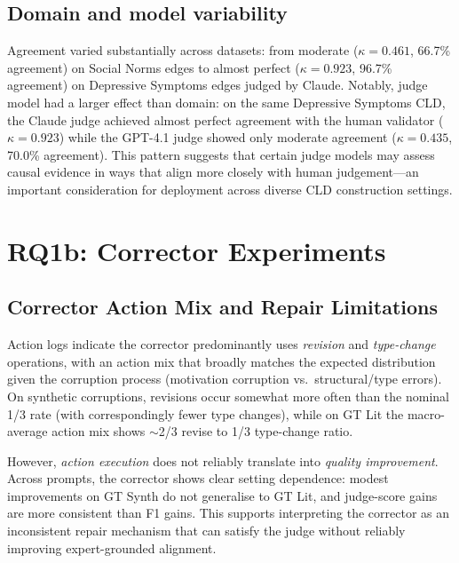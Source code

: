 \subsection{Domain and model variability} Agreement varied substantially across datasets: from moderate ($\kappa = 0.461$, 66.7\% agreement) on Social Norms edges to almost perfect ($\kappa = 0.923$, 96.7\% agreement) on Depressive Symptoms edges judged by Claude. Notably, judge model had a larger effect than domain: on the same Depressive Symptoms CLD, the Claude judge achieved almost perfect agreement with the human validator ($\kappa = 0.923$) while the GPT-4.1 judge showed only moderate agreement ($\kappa = 0.435$, 70.0\% agreement). This pattern suggests that certain judge models may assess causal evidence in ways that align more closely with human judgement---an important consideration for deployment across diverse CLD construction settings.

\section{RQ1b: Corrector Experiments}
\label{sec:discussion_rq1b}

\subsection{Corrector Action Mix and Repair Limitations}

Action logs indicate the corrector predominantly uses \textit{revision} and \textit{type-change} operations, with an action mix that broadly matches the expected distribution given the corruption process (motivation corruption vs.\ structural/type errors). On synthetic corruptions, revisions occur somewhat more often than the nominal 1/3 rate (with correspondingly fewer type changes), while on GT Lit the macro-average action mix shows $\sim$2/3 revise to 1/3 type-change ratio.

However, \textit{action execution} does not reliably translate into \textit{quality improvement}. Across prompts, the corrector shows clear setting dependence: modest improvements on GT Synth do not generalise to GT Lit, and judge-score gains are more consistent than F1 gains. This supports interpreting the corrector as an inconsistent repair mechanism that can satisfy the judge without reliably improving expert-grounded alignment.

